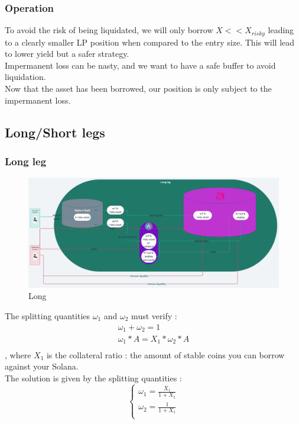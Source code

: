 \documentclass[conference]{IEEEtran}
\begin{document}
\subsubsection{Operation}
To avoid the risk of being liquidated, we will only borrow $X << X_{risky}$ leading to a clearly smaller LP position when compared to the entry size. This will lead to lower yield but a safer strategy.\\
Impermanent loss can be nasty, and we want to have a safe buffer to avoid liquidation.\\
Now that the asset has been borrowed, our position is only subject to the impermanent loss.\\
\subsection{Long/Short legs}
\subsubsection{Long leg}
\begin{figure}[h!]
    \centering
    \includegraphics[scale=0.035]{Plots/long_leg.png}
    \caption{Long}
    \label{fig:long_leg}
\end{figure}
The splitting quantities $\omega_1$ and $\omega_2$ must verify : 
\begin{equation}
\begin{array}{ll}
\omega_1 + \omega_2 = 1\\
\omega_1 * A = X_1*\omega_2 * A\\    
\end{array}
\end{equation}
, where $X_1$ is the collateral ratio : the amount of stable coins you can borrow against your Solana.\\
The solution is given by the splitting quantities :
\begin{equation}
\left\{
\begin{array}{ll}
\omega_1  = \frac{X_1}{1+X_1}\\
\omega_2  = \frac{1}{1+X_1}\\
\end{array}\right.
\end{equation}
\end{document}
